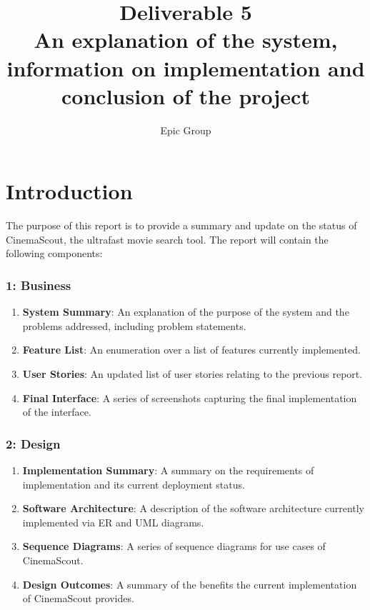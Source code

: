 \documentclass{article}
\begin{document}
\title{%
 Deliverable 5\\
 \large An explanation of the system, information on implementation and\\
 \large conclusion of the project
}
\author{Epic Group}
\date{}
\maketitle

\section*{Introduction}
The purpose of this report is to provide a summary and update on the status of
CinemaScout, the ultrafast movie search tool. The report will contain the following
components:
\subsubsection*{1: Business}
\begin{enumerate}
\item \textbf{System Summary}: An explanation of the purpose of the system
and the problems addressed, including problem statements.
\item \textbf{Feature List}: An enumeration over a list of features currently
implemented.
\item \textbf{User Stories}: An updated list of user stories relating to the
previous report.
\item \textbf{Final Interface}: A series of screenshots capturing the final
implementation of the interface.
\end{enumerate}
\subsubsection*{2: Design}
\begin{enumerate}
\item \textbf{Implementation Summary}: A summary on the requirements of
implementation and its current deployment status.
\item \textbf{Software Architecture}: A description of the software
architecture currently implemented via ER and UML diagrams.
\item \textbf{Sequence Diagrams}: A series of sequence diagrams for
use cases of CinemaScout.
\item \textbf{Design Outcomes}: A summary of the benefits the current 
implementation of CinemaScout provides.
\end{enumerate}
\end{document}
